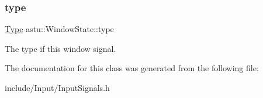 \subsubsection{\texorpdfstring{type}{type}}
{\footnotesize\ttfamily \hyperlink{classastu_1_1WindowState_ae7ebaae8631a7957bd576aabc3914036}{Type} astu\+::\+Window\+State\+::type}

The type if this window signal. 

The documentation for this class was generated from the following file\+:\begin{DoxyCompactItemize}
\item 
include/\+Input/Input\+Signals.\+h\end{DoxyCompactItemize}
